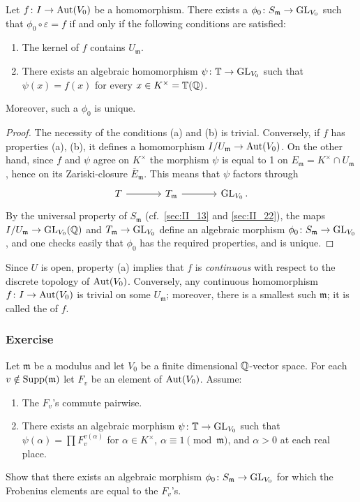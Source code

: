 \begin{prop}
Let $f \colon I \to \operatorname{Aut}(V_0)$ be a homomorphism. There exists a $\phi_0
\colon S_{\mathfrak{m}} \to \operatorname{GL}_{V_0}$ such that $\phi_0 \circ \varepsilon =
f$ if and only if the following conditions are satisfied:
\begin{enumerate}
	\item The kernel of $f$ contains $U_{\mathfrak{m}}$.
	\item There exists an algebraic homomorphism $\psi\colon \mathbb{T} \to
		\operatorname{GL}_{V_0}$ such that $\psi(x) = f(x)$ for every $x \in K^\times
		= \mathbb{T}(\mathbb{Q})$.
\end{enumerate}
Moreover, such a $\phi_0$ is unique.
\end{prop}
\begin{proof}
The necessity of the conditions (a) and (b) is trivial. 
Conversely, if $f$ has properties (a), (b), it defines a homomorphism
$I/U_{\mathfrak{m}} \to \operatorname{Aut}(V_0)$. On the other hand, since $f$ and $\psi$ agree on $K^\times$
the morphism $\psi$ is equal to 1 on $E_{\mathfrak{m}} = K^\times \cap U_{\mathfrak{m}}$, hence on its
Zariski-closure $\overline{E}_{\mathfrak{m}}$. This means that $\psi$ factors through
\[\begin{tikzcd}[sep=large]
	T \rar & T_{\mathfrak{m}} \rar & \GL_{V_0}.
\end{tikzcd}\]
By the universal property of $S_{\mathfrak{m}}$ (cf.\ \ref{sec:II_13} and
\ref{sec:II_22}), the maps $I/U_{\mathfrak{m}} \to \operatorname{GL}_{V_0}(\mathbb{Q})$ and
$T_{\mathfrak{m}} \to \operatorname{GL}_{V_0}$ define an algebraic morphism $\phi_0 \colon
S_{\mathfrak{m}} \to \operatorname{GL}_{V_0}$, and one checks easily that $\phi_0$ has the
required properties, and is unique.
\end{proof}

\begin{obs}
Since $U$ is open, property (a) implies that $f$ is \emph{continuous} with
\dpage
respect to the discrete topology of $\operatorname{Aut}(V_0)$. Conversely, any continuous
homomorphism $f\colon I \to \operatorname{Aut}(V_0)$ is trivial on some $U_{\mathfrak{m}}$;
moreover, there is a smallest such $\mathfrak{m}$; it is called the
 of $f$.
\end{obs}

\subsubsection*{Exercise}
Let $\mathfrak{m}$ be a modulus and let $V_0$ be a finite dimensional
$\mathbb{Q}$-vector space. For each $v \notin \operatorname{Supp}(\mathfrak{m})$ let $F_v$ be an
element of $\operatorname{Aut}(V_0)$. Assume:
\begin{enumerate}
	\item The $F_v$'s commute pairwise.
	\item There exists an algebraic morphism $\psi\colon \mathbb{T} \to \operatorname{GL}_{V_0}$
		such that $\psi(\alpha) = \prod F_v^{v(\alpha)}$ for $\alpha
		\in K^\times$, $\alpha \equiv 1 \pmod{\mathfrak{m}}$, and
		$\alpha > 0$ at each real place.
\end{enumerate}
Show that there exists an algebraic morphism $\phi_0 \colon S_{\mathfrak{m}}
\to \operatorname{GL}_{V_0}$ for which the Frobenius elements are equal to the $F_v$'s.

